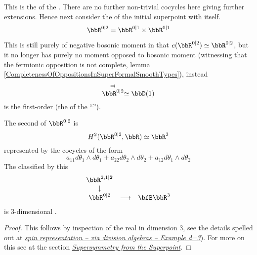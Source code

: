 This is the  of the .
There are no further non-trivial cocycles here giving further extensions.
Hence next consider the  of the initial superpoint with itself.
\begin{displaymath}
\bbR^{0|2}
=
\bbR^{0|1}\times \bbR^{0|1}
\end{displaymath}
\begin{remark}
\label{}\hypertarget{}{}
This is still purely of negative bosonic moment in that $e(\bbR^{0|2}) \simeq \bbR^{0|2}$, but it no longer has purely no moment opposed to bosonic moment (witnessing that the fermionic opposition is not complete, lemma \ref{CompletenessOfOppositionsInSuperFormalSmoothTypes}), instead
\begin{displaymath}
\stackrel{\rightrightarrows}{\bbR^{0|2}}
\simeq
\bbD(1)
\end{displaymath}
is the first-order  (the  of the ``'').
\end{remark}
\begin{prop}
\label{3dSuperMinkowskiSpacetime}\hypertarget{3dSuperMinkowskiSpacetime}{}
The second   of $\bbR^{0\vert 2}$ is
\begin{displaymath}
H^2(\bbR^{0\vert 2}, \bbR)
\simeq
\bbR^3
\end{displaymath}
represented by the cocycles of the form
\begin{displaymath}
a_{11}

d\theta_1 \wedge d\theta_1
+
a_{22}

d\theta_2 \wedge d\theta_2
+
a_{12}

d\theta_1 \wedge d\theta_2
\end{displaymath}
The  classified by this
\begin{displaymath}
\itexarray{
\bbR^{2,1|\mathbf{2}}
\\
\downarrow
\\
\bbR^{0|2}
&\stackrel{}{\longrightarrow}&
\bfB \bbR^3
}
\end{displaymath}
is 3-dimensional .
\end{prop}
\begin{proof}
This follows by inspection of the real  in dimension 3, see the details spelled out at \emph{\href{http://ncatlab.org/nlab/show/spin%20representation#RealSpinorRepsIn3d}{spin representation -- via division algebras -- Example d=3}}).
For more on this see at  the section \emph{\href{https://ncatlab.org/nlab/show/geometry+of+physics+--+supersymmetry#SupersymmetryFromTheSuperpoint}{Supersymmetry from the Superpoint}}.
\end{proof}
